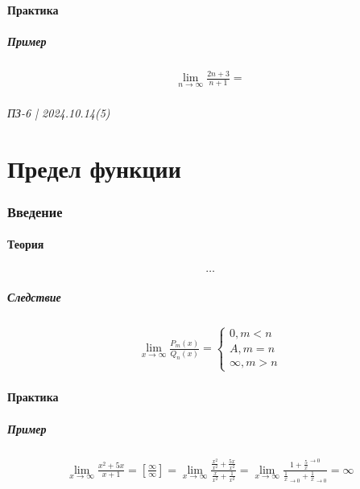 \documentclass{article}
\begin{document}
\subsection{Практика}

\subsubsection{Пример}
\begin{gather*}
    \lim_{n \to \infty} \frac{2n + 3}{n + 1} = 
\end{gather*}




\newpage
\paragraph{ПЗ-6 | 2024.10.14(5)}
\part{Предел функции}

\section{Введение}

\subsection{Теория}
\begin{gather*}
    \dots
\end{gather*}

\subsubsection{Следствие}
\begin{gather*}
    \lim_{x \to \infty} \frac{P_m(x)}{Q_n(x)} =
    \begin{cases}
        0, m < n \\
        A, m = n \\
        \infty, m > n
    \end{cases}
\end{gather*}


\subsection{Практика}

\subsubsection{Пример}
\begin{gather*}
    \lim_{x \to \infty} \frac{x^2 + 5x}{x + 1} = 
    \left[ \frac{\infty}{\infty} \right] =
    \lim_{x \to \infty} \frac{\frac{x^2}{x^2} + \frac{5x}{x^2}}{\frac{x}{x^2} + \frac{1}{x^2}} =
    \lim_{x \to \infty} \frac{1 + \boxed{\frac{5}{x}}^{\to 0}}{\boxed{\frac{1}{x}}_{\to 0} + \boxed{\frac{1}{x}}_{\to 0}} = 
    \infty
\end{gather*}
\end{document}
